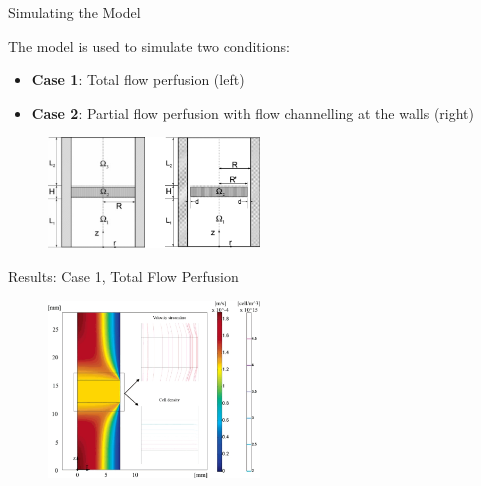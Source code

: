 \documentclass[11pt,t]{beamer}
\begin{document}
\begin{frame}[fragile]{Simulating the Model}  

The model is used to simulate two conditions:

\begin{itemize}
\item
\textbf{Case 1}: Total flow perfusion (left)
\item
\textbf{Case 2}: Partial flow perfusion with flow channelling at the walls (right)
\end{itemize}

			\begin{figure}
			\centering
			\includegraphics[width=0.50\textwidth]{math_models}
			\end{figure}

\end{frame}




\begin{frame}[fragile]{Results: Case 1, Total  Flow Perfusion}  
			
			\begin{figure}
			\centering
			\includegraphics[width=0.5\textwidth]{math_tot_vel}
			
			\end{figure}
		
\end{frame}
\end{document}
